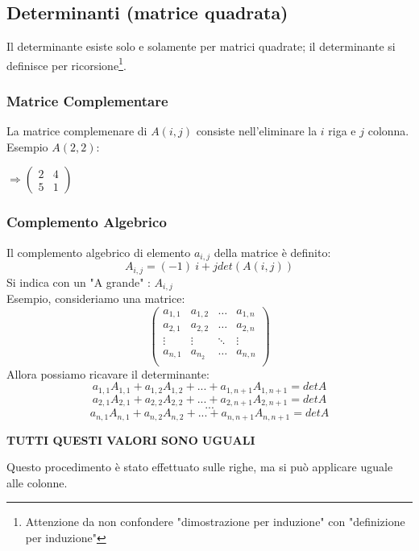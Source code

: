 \subsection{Determinanti (matrice quadrata)}
Il determinante esiste solo e solamente per matrici quadrate; il determinante si definisce per ricorsione\footnote{Attenzione da non confondere "dimostrazione per induzione" con "definizione per induzione"}.\\

\subsubsection{Matrice Complementare}
La matrice complemenare di $A(i,j)$ consiste nell'eliminare la $i$ riga e $j$ colonna.\\
Esempio $A(2,2)$:
\begin{center}
\stackMath
{}
$\Rightarrow
\begin{pmatrix}
2 & 4 \\
5 & 1 
\end{pmatrix}$
\end{center}

\subsubsection{Complemento Algebrico}
Il complemento algebrico di elemento $a_{i,j}$ della matrice è definito:
$$ A_{i,j} = (-1)~{i+j} det(A(i,j)) $$
Si indica con un "A grande" : $A_{i,j}$\\
Esempio, consideriamo una matrice:
$$ 
\begin{pmatrix}
a_{1,1} & a_{1,2} & \dots & a_{1,n} \\
a_{2,1} & a_{2,2} & \dots & a_{2,n} \\
\vdots & \vdots & \ddots & \vdots \\
a_{n,1} & a_{n_2} & \dots & a_{n,n} \\
\end{pmatrix}
$$
Allora possiamo ricavare il determinante:
$$ a_{1,1}A_{1,1}+a_{1,2}A_{1,2}+...+a_{1,n+1}A_{1,n+1} = det A $$
$$ a_{2,1}A_{2,1}+a_{2,2}A_{2,2}+...+a_{2,n+1}A_{2,n+1} = det A $$
$$ ... $$
$$ a_{n,1}A_{n,1}+a_{n,2}A_{n,2}+...+a_{n,n+1}A_{n,n+1} = det A $$
\begin{center}
\textbf{TUTTI QUESTI VALORI SONO UGUALI}
\end{center}
Questo procedimento è stato effettuato sulle righe, ma si può applicare uguale alle colonne.

